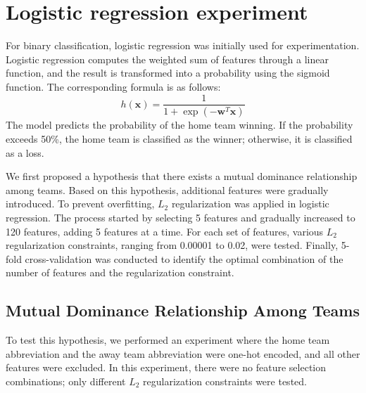 \documentclass[12pt,a4paper]{article}
\begin{document}
\section{Logistic regression experiment}

For binary classification, logistic regression was initially used for experimentation. Logistic regression computes the weighted sum of features through a linear function, and the result is transformed into a probability using the sigmoid function. The corresponding formula is as follows:
\[
h(\mathbf{x}) = \frac{1}{1 + \exp(-\mathbf{w}^T \mathbf{x})}
\]
The model predicts the probability of the home team winning. If the probability exceeds 50\%, the home team is classified as the winner; otherwise, it is classified as a loss.

We first proposed a hypothesis that there exists a mutual dominance relationship among teams. Based on this hypothesis, additional features were gradually introduced. To prevent overfitting, \( L_2 \) regularization was applied in logistic regression. The process started by selecting 5 features and gradually increased to 120 features, adding 5 features at a time. For each set of features, various \( L_2 \) regularization constraints, ranging from 0.00001 to 0.02, were tested. Finally, 5-fold cross-validation was conducted to identify the optimal combination of the number of features and the regularization constraint.

\subsection{Mutual Dominance Relationship Among Teams}  

To test this hypothesis, we performed an experiment where the home team abbreviation and the away team abbreviation were one-hot encoded, and all other features were excluded. In this experiment, there were no feature selection combinations; only different \(L_2\) regularization constraints were tested.


\end{document}
